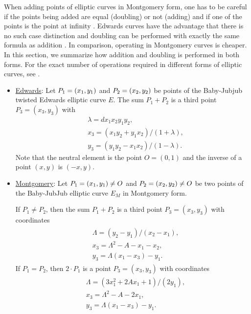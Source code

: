When adding points of elliptic curves %
in Montgomery form,  
one has to be careful if the points being added are equal (doubling) or not (adding) and if one of the points is the point at infinity \cite{montgomery}. 
%
Edwards curves have the advantage that there is no such case distinction and doubling can be performed with exactly the same formula as addition \cite{twisted}. 
%
In comparison, operating in Montgomery curves is cheaper. In this section, we summarize how addition and doubling is performed in both forms. 
%
For the exact number of operations required in different forms of elliptic curves, see \cite{twisted}.

\begin{itemize}
	
	\item \underline{Edwards}: 	
	Let $P_{1} = (x_{1}, y_{1})$ and $P_{2} = (x_{2}, y_{2})$ be points of the Baby-Jubjub twisted Edwards elliptic curve $E$. The sum $P_1 + P_2$ is a third point $P_3 = (x_3, y_3)$ with 
		\begin{align*}
			&\lambda = d x_1x_2y_1y_2,\\
			&x_3 = (x_1y_2 + y_1x_2) / (1 + \lambda),\\
			&y_3 = (y_1y_2 - x_1x_2) / (1 - \lambda).
		\end{align*}
	Note that the neutral element is the point $O = (0,1)$ and the inverse of a point $(x,y)$ is $(-x,y)$.

	\item \underline{Montgomery}: 
	Let $P_{1} = (x_{1}, y_{1})\not=O$ and $P_{2} = (x_{2}, y_{2})\not=O$ be two points of the Baby-JubJub elliptic curve $E_M$ in Montgomery form. 
	
	If $P_1\not=P_2$, then the sum $P_1 + P_2$ is a third point $P_3 = (x_3, y_3)$ with coordinates
		\begin{align}
		\label{eq-ted}
		\begin{split}
			&\Lambda = (y_2-y_1)/ (x_2-x_1),\\
			&x_3 = \Lambda^2 - A - x_1 - x_2,\\
			&y_3 = \Lambda(x_1- x_3) - y_1.
		\end{split}
		\end{align}
	If $P_1 = P_2$, then $2\cdot P_1$ is a point $P_3 = (x_3, y_3)$ with coordinates
		\begin{align}
		\label{eq-mont}
		\begin{split}
			&\Lambda = (3x_1^2 + 2Ax_1 + 1)/ (2y_1),\\
			&x_3 = \Lambda^2 - A - 2x_1,\\
			&y_3 = \Lambda(x_1- x_3) - y_1.
		\end{split}	
		\end{align}
	
\end{itemize}